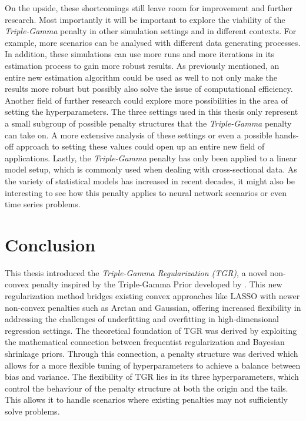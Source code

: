 \documentclass[12pt,a4paper]{article}
\begin{document}
On the upside, these shortcomings still leave room for improvement and further research. Most importantly it will be important to explore the viability of the \textit{Triple-Gamma} penalty in other simulation settings and in different contexts. For example, more scenarios can be analysed with different data generating processes. In addition, these simulations can use more runs and more iterations in its estimation process to gain more robust results. As previously mentioned, an entire new estimation algorithm could be used as well to not only make the results more robust but possibly also solve the issue of computational efficiency. Another field of further research could explore more possibilities in the area of setting the hyperparameters. The three settings used in this thesis only represent a small subgroup of possible penalty structures that the \textit{Triple-Gamma} penalty can take on. A more extensive analysis of these settings or even a possible hands-off approach to setting these values could open up an entire new field of applications. Lastly, the \textit{Triple-Gamma} penalty has only been applied to a linear model setup, which is commonly used when dealing with cross-sectional data. As the variety of statistical models has increased in recent decades, it might also be interesting to see how this penalty applies to neural network scenarios or even time series problems.

\section{Conclusion}

This thesis introduced the \textit{Triple-Gamma Regularization (TGR)}, a novel non-convex penalty inspired by the Triple-Gamma Prior developed by \textcite{TGP2020}. This new regularization method bridges existing convex approaches like LASSO with newer non-convex penalties such as Arctan and Gaussian, offering increased flexibility in addressing the challenges of underfitting and overfitting in high-dimensional regression settings. The theoretical foundation of TGR was derived by exploiting the mathematical connection between frequentist regularization  and Bayesian shrinkage priors. Through this connection, a penalty structure was derived which allows for a more flexible tuning of hyperparameters to achieve a balance between bias and variance. The flexibility of TGR lies in its three hyperparameters, which control the behaviour of the penalty structure at both the origin and the tails. This allows it to handle scenarios where existing penalties may not sufficiently solve problems.\\
\end{document}
